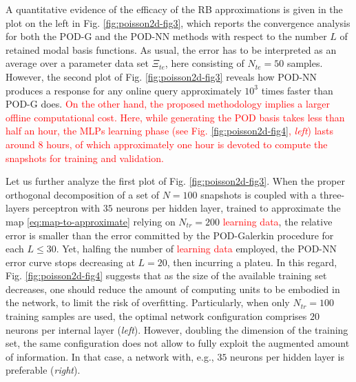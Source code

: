 \documentclass[longtitle]{elsarticle}
\numberwithin{equation}{section}
\theoremstyle{theorem}
\theoremstyle{definition}
\theoremstyle{remark}
\theoremstyle{proposition}
\numberwithin{figure}{section}
\begin{document}
		
		A quantitative evidence of the efficacy of the RB approximations is given in the plot on the left in Fig. \ref{fig:poisson2d-fig3}, which reports the convergence analysis for both the POD-G and the POD-NN methods with respect to the number $L$ of retained modal basis functions. As usual, the error has to be interpreted as an average over a parameter data set $\Xi_{te}$, here consisting of $N_{te} = 50$ samples. However, the second plot of Fig. \ref{fig:poisson2d-fig3} reveals how POD-NN produces a response for any online query approximately $10^3$ times faster than POD-G does. \textcolor{red}{On the other hand, the proposed methodology implies a larger offline computational cost. Here, while generating the POD basis takes less than half an hour, the MLPs learning phase (see Fig. \ref{fig:poisson2d-fig4}, \emph{left}) lasts around $8$ hours, of which approximately one hour is devoted to compute the snapshots for training and validation.} 

		Let us further analyze the first plot of Fig. \ref{fig:poisson2d-fig3}. When the proper orthogonal decomposition of a set of $N = 100$ snapshots is coupled with a three-layers perceptron with $35$ neurons per hidden layer, trained to approximate the map \eqref{eq:map-to-approximate} relying on $N_{tr} = 200$ \textcolor{red}{learning data}, the relative error is smaller than the error committed by the POD-Galerkin procedure for each $L \leq 30$. Yet, halfing the number of \textcolor{red}{learning data} employed, the POD-NN error curve stops decreasing at $L = 20$, then incurring a plateu. In this regard, Fig. \ref{fig:poisson2d-fig4} suggests that as the size of the available training set decreases, one should reduce the amount of computing units to be embodied in the network, to limit the risk of overfitting. Particularly, when only $N_{tr} = 100$ training samples are used, the optimal network configuration comprises $20$ neurons per internal layer (\emph{left}). However, doubling the dimension of the training set, the same configuration does not allow to fully exploit the augmented amount of information. In that case, a network with, e.g., $35$ neurons per hidden layer is preferable (\emph{right}). 
	
\end{document}
